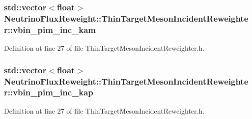 \hypertarget{class_neutrino_flux_reweight_1_1_thin_target_meson_incident_reweighter_a1673f9e513edfa4f1435c572870d3b84}{
\subsubsection[{vbin\-\_\-pim\-\_\-inc\-\_\-kam}]{\setlength{\rightskip}{0pt plus 5cm}std\-::vector$<$float$>$ Neutrino\-Flux\-Reweight\-::\-Thin\-Target\-Meson\-Incident\-Reweighter\-::vbin\-\_\-pim\-\_\-inc\-\_\-kam}}\label{class_neutrino_flux_reweight_1_1_thin_target_meson_incident_reweighter_a1673f9e513edfa4f1435c572870d3b84}


Definition at line 27 of file Thin\-Target\-Meson\-Incident\-Reweighter.\-h.

\hypertarget{class_neutrino_flux_reweight_1_1_thin_target_meson_incident_reweighter_adb7bd7bf69b005ef32845bf80d0dcff3}{
\subsubsection[{vbin\-\_\-pim\-\_\-inc\-\_\-kap}]{\setlength{\rightskip}{0pt plus 5cm}std\-::vector$<$float$>$ Neutrino\-Flux\-Reweight\-::\-Thin\-Target\-Meson\-Incident\-Reweighter\-::vbin\-\_\-pim\-\_\-inc\-\_\-kap}}\label{class_neutrino_flux_reweight_1_1_thin_target_meson_incident_reweighter_adb7bd7bf69b005ef32845bf80d0dcff3}


Definition at line 27 of file Thin\-Target\-Meson\-Incident\-Reweighter.\-h.

